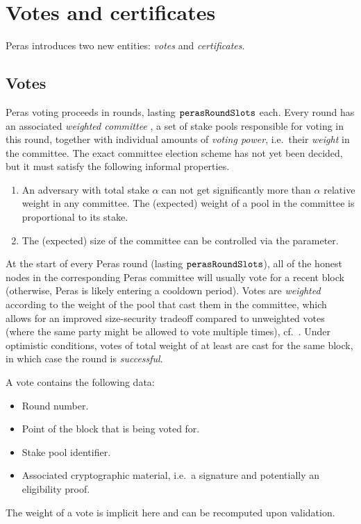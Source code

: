 \section{Votes and certificates}

Peras introduces two new entities: \emph{votes} and \emph{certificates}.

\subsection{Votes}

Peras voting proceeds in rounds, lasting $\mathtt{perasRoundSlots}$ each.
Every round has an associated \emph{weighted committee} \parencite[Section~4]{gavzi2023fait}, a set of stake pools responsible for voting in this round, together with individual amounts of \emph{voting power}, i.e.\ their \emph{weight} in the committee.
The exact committee election scheme has not yet been decided, but it must satisfy the following informal properties.
\begin{enumerate}
\item
  An adversary with total stake $\alpha$ can not get significantly more than $\alpha$ relative weight in any committee.
  The (expected) weight of a pool in the committee is proportional to its stake.
\item
  The (expected) size of the committee can be controlled via the \perasN{} parameter.
\end{enumerate}

At the start of every Peras round (lasting $\mathtt{perasRoundSlots}$), all of the honest nodes in the corresponding Peras committee will usually vote for a recent block (otherwise, Peras is likely entering a cooldown period).
Votes are \emph{weighted} according to the weight of the pool that cast them in the committee, which allows for an improved size-security tradeoff compared to unweighted votes (where the same party might be allowed to vote multiple times), cf.~\cite{gavzi2023fait}.
Under optimistic conditions, votes of total weight of at least \perasQuorum{} are cast for the same block, in which case the round is \emph{successful}.

A vote contains the following data:
\begin{itemize}
\item Round number.
\item Point of the block that is being voted for.
\item Stake pool identifier.
\item Associated cryptographic material, i.e.\ a signature and potentially an eligibility proof.
\end{itemize}
The weight of a vote is implicit here and can be recomputed upon validation.

